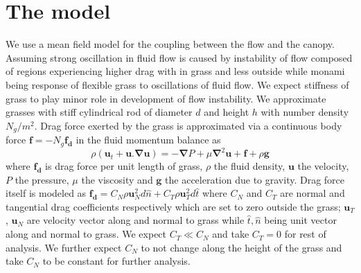 \documentclass[aps,twocolumn,floatfix,prl,10pt]{revtex4-1}
\newcommand{\bu}{\mathbf{u}}
\newcommand{\grad}{\mathbf{\nabla}}
\begin{document}
\section{The model}
We use a mean field model for the coupling between the flow and the canopy. Assuming strong oscillation in fluid flow is caused by instability of flow
composed of regions experiencing higher drag with in grass and less outside while monami being response of flexible grass to oscillations of fluid flow. We expect stiffness 
of grass to play minor role in development of flow instability. We approximate grasses with stiff cylindrical rod of diameter $d$ and height $h$ with number density $N_g/m^2$. 
Drag force exerted by the grass is approximated via a continuous body force $\mathbf{f}=-N_g\mathbf{f_d}$ in the fluid momentum balance as
\begin{equation}
\rho \left(\bu_{t}+\bu.\grad\bu \right) = -\grad P+\mu\grad^{2}\bu +\mathbf{f}+\rho\mathbf{g}
\end{equation}
where $\mathbf{f_{d}}$ is drag force per unit length of grass, $\rho$ the fluid density, $\mathbf{u}$ the velocity, $P$ the pressure, $\mu$ the viscosity and $\mathbf{g}$
the acceleration due to gravity. Drag force itself is modeled as $\mathbf{f_{d}}=C_N \rho\bu_{N}^{2}d\hat{n}+C_{T}\rho\bu_{T}^{2}d\hat{t}$ where 
$C_{N}$ and $C_{T}$ are normal and tangential drag coefficients respectively which are set to zero outside the grass; $\bu_{T}$, $\bu_{N}$ are velocity vector along and
normal to grass while $\hat{t},\hat{n}$ being unit vector along and normal to grass. We expect $C_T \ll C_N$ and take $C_T=0$ for rest of analysis. We further expect $C_N$ to
not change along the height of the grass and take $C_N$ to be constant for further analysis. 
\end{document}
